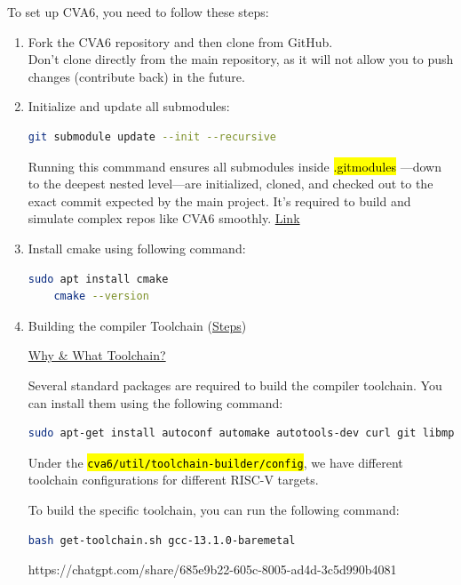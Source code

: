 \documentclass[12pt, a4paper]{article}
\begin{document}
To set up CVA6, you need to follow these steps:
\begin{enumerate}
    \item Fork the CVA6 repository and then clone from GitHub. \\
    Don't clone directly from the main repository, as it will not allow you to push changes (contribute back) in the future.

    \item Initialize and update all submodules:

        \begin{lstlisting}[language=bash, frame=single, basicstyle=\ttfamily\footnotesize]
    git submodule update --init --recursive
        \end{lstlisting}

        Running this commmand ensures all submodules inside \hl{.gitmodules} —down to the deepest nested level—are initialized, cloned, and checked out to the exact commit expected by the main project. It's required to build and simulate complex repos like CVA6 smoothly. \href{https://chatgpt.com/s/t_6859c638d5208191bfd8707c9580f31a}{Link}
    
    \item Install cmake using following command:

        \begin{lstlisting}[language=bash, frame=single, basicstyle=\ttfamily\footnotesize]
    sudo apt install cmake
    cmake --version
        \end{lstlisting}

    \item Building the compiler Toolchain (\href{https://chatgpt.com/s/t_685e68ba0bfc81918b7b5a289666f145}{Steps})
        
        \href{https://chatgpt.com/s/t_685e51d3aca08191a9d3c16adf555498}{Why \& What Toolchain?} 

        Several standard packages are required to build the compiler toolchain. You can install them using the following command:

        \begin{lstlisting}[language=bash, frame=single, basicstyle=\ttfamily\footnotesize]
    sudo apt-get install autoconf automake autotools-dev curl git libmpc-dev libmpfr-dev libgmp-dev gawk build-essential bison flex texinfo gperf libtool bc zlib1g-dev
        \end{lstlisting}

        Under the \hl{\texttt{cva6/util/toolchain-builder/config}}, we have different toolchain configurations for different RISC-V targets.

        To build the specific toolchain, you can run the following command:

        \begin{lstlisting}[language=bash, frame=single, basicstyle=\ttfamily\footnotesize]
        bash get-toolchain.sh gcc-13.1.0-baremetal
        \end{lstlisting}

        https://chatgpt.com/share/685e9b22-605c-8005-ad4d-3c5d990b4081

\end{enumerate}
\end{document}
